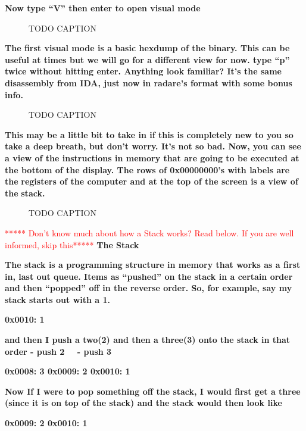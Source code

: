 \documentclass[letterpaper]{article}
\newcommand{\sitfig}[3]{
\begin{figure}[H]
\centering
\makebox[\textwidth][c]{
#2
}
\caption{#3}
\label{#1}
\end{figure}
}
\newcommand{\sitgfx}[4][scale=1.0]{
\sitfig{#3}{\texttt{[image: \#2]}}{#4}
}
\begin{document}
\textbf{Now type ``V'' then enter to open visual mode}

  
\sitgfx[width=6.5in,height=4.2362in]{FINALWORKINGDOCFORMERLYPRECURSOR-img025.png}{fig:unk}{TODO CAPTION}
 

\textbf{The first visual mode is a basic hexdump of the binary. This can be useful at times but we will go for a
different view for now. type ``p'' twice without hitting enter. Anything look familiar? It's the same disassembly from
IDA, just now in radare's format with some bonus info.}

  
\sitgfx[width=6.5in,height=4.7362in]{FINALWORKINGDOCFORMERLYPRECURSOR-img026.png}{fig:unk}{TODO CAPTION}
 

\textbf{This may be a little bit to take in if this is completely new to you so take a deep breath, but don't worry.
It's not so bad. Now, you can see a view of the instructions in memory that are going to be executed at the bottom of
the display. The rows of 0x00000000's with labels are the
}\textbf{\textcolor[rgb]{0.21960784,0.4627451,0.11372549}{registers }}\textbf{of the computer and at the top of the
screen is a view of the }\textbf{\textcolor[rgb]{0.21960784,0.4627451,0.11372549}{stack}}\textbf{.}

  
\sitgfx[width=5.8335in,height=3.6457in]{FINALWORKINGDOCFORMERLYPRECURSOR-img027.png}{fig:unk}{TODO CAPTION}
\textcolor{red}{***** Don't know much about how a Stack works? Read below. If you are well informed, skip
this*****}\newline
\textbf{The Stack}

\textbf{The stack is a programming structure in memory that works as a first in, last out queue. Items as ``pushed'' on
the stack in a certain order and then ``popped'' off in the reverse order. So, for example, say my stack starts out
with a 1.}

\textbf{0x0010: 1}

\textbf{and then I push a two(2) and then a three(3) onto the stack \newline
in that order - push 2 \newline
\ \   {}- push 3}

\textbf{0x0008: 3\newline
0x0009: 2\newline
0x0010: 1}

\textbf{Now If I were to pop something off the stack, I would first get a three (since it is on top of the stack) and
the stack would then look like}

\textbf{0x0009: 2\newline
0x0010: 1}
\end{document}
